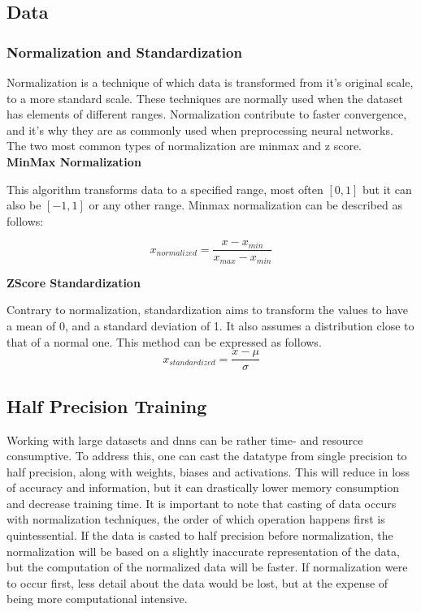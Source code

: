 \subsection{Data}
\label{back:data}

\subsubsection{Normalization and Standardization}

Normalization is a technique of which data is transformed from it's original scale, to a more standard scale. These techniques are normally used when the dataset has elements of different ranges. Normalization contribute to faster convergence, and it's why they are as commonly used when preprocessing neural networks. 
The two most common types of normalization are minmax and z score. \\

\textbf{MinMax Normalization}

This algorithm transforms data to a specified range, most often $[0, 1]$ but it can also be $[-1, 1]$ or any other range.
Minmax normalization can be described as follows:

\begin{equation}
   x_{normalized} = \dfrac{x - x_{min}}{x_{max}-x_{min}}
\end{equation}

\textbf{ZScore Standardization}

Contrary to normalization, standardization aims to transform the values to have a mean of 0, and a standard deviation of 1. It also assumes a distribution close to that of a normal one. This method can be expressed as follows. \\ 
\begin{equation}
   x_{standardized} = \dfrac{x - \mu}{\sigma}
\end{equation}

\subsection{Half Precision Training}

Working with large datasets and \acrshort{dnn}s can be rather time- and resource consumptive. To address this, one can cast the datatype from single precision to half precision, along with weights, biases and activations. This will reduce in loss of accuracy and information, but it can drastically lower memory consumption and decrease training time. It is important to note that casting of data occurs with normalization techniques, the order of which operation happens first is quintessential. If the data is casted to half precision before normalization, the normalization will be based on a slightly inaccurate representation of the data, but the computation of the normalized data will be faster. If normalization were to occur first, less detail about the data would be lost, but at the expense of being more computational intensive. \\

